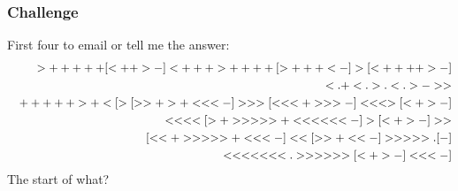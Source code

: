 \documentclass[12pt]{article}
\begin{document}
\subsubsection*{Challenge}
First four to email or tell me the answer:
\begin{eqnarray}
&&>+++++[<++>-]<+++ >++++[>+++<-]>[<++++>-]\cr 
&&<.+< . >. < . >-> >\cr
&&+++++>+< [ >[> >+>+< < <-] > > >[< < <+> > >-]< < < >[<+>-]\cr
&&< < < <[>+> > > > >+< < < < < <-] >[<+>-] > >\cr
&&[< <+> > > > >+< < <-] < <[> >+< <-]> > > > >.[-]\cr 
&&< < < < < < < .  > > > > > > [<+>-]< < <-]
\end{eqnarray}
The start of what?
 
\end{document}

